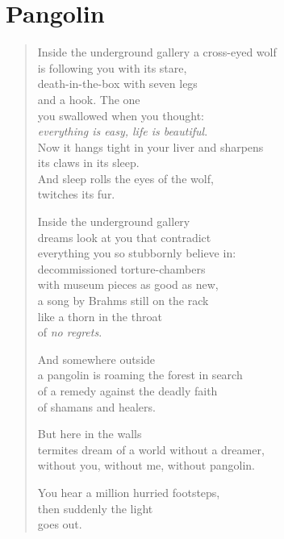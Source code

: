 \clearpage

\section{Pangolin}

\begin{verse}

Inside the underground gallery a cross-eyed wolf\\
is following you with its stare,\\
death-in-the-box with seven legs\\
and a hook. The one\\
you swallowed when you thought:\\
\emph{everything is easy, life is beautiful}.\\
Now it hangs tight in your liver and sharpens\\
its claws in its sleep.\\
And sleep rolls the eyes of the wolf,\\
twitches its fur.

Inside the underground gallery\\
dreams look at you that contradict\\
everything you so stubbornly believe in:\\
decommissioned torture-chambers\\
with museum pieces as good as new,\\
a song by Brahms still on the rack\\
like a thorn in the throat\\
of \emph{no regrets}.

And somewhere outside\\
a pangolin is roaming the forest in search\\
of a remedy against the deadly faith\\
of shamans and healers.

\clearpage

But here in the walls\\
termites dream of a world without a dreamer,\\
without you, without me, without pangolin.

You hear a million hurried footsteps,\\
then suddenly the light\\
goes out.

\end{verse}

